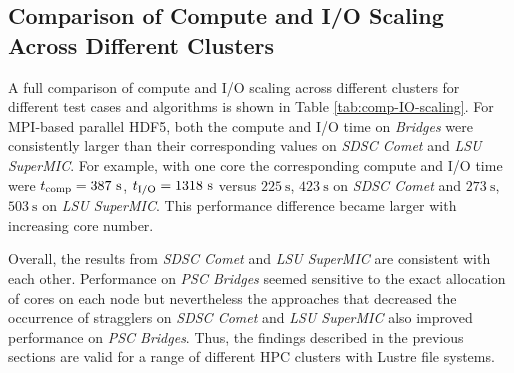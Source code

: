 \subsection{Comparison of Compute and I/O Scaling Across Different Clusters}
A full comparison of compute and I/O scaling across different clusters for different test cases and algorithms is shown in Table \ref{tab:comp-IO-scaling}. 
For MPI-based parallel HDF5, both the compute and I/O time on \emph{Bridges} were consistently larger than their corresponding values on \emph{SDSC Comet} and \emph{LSU SuperMIC}.
For example, with one core the corresponding compute and I/O time were ${t}_{\text{comp}} = 387~\text{s}$, ${t}_{\text{I/O}} = 1318~\text{s}$ versus $225~\text{s}$, $423~\text{s}$ on \emph{SDSC Comet} and $273~\text{s}$, $503~\text{s}$ on \emph{LSU SuperMIC}.
This performance difference became larger with increasing core number.

Overall, the results from \emph{SDSC Comet} and \emph{LSU SuperMIC} are consistent with each other.
Performance on \emph{PSC Bridges} seemed sensitive to the exact allocation of cores on each node but nevertheless the approaches that decreased the occurrence of stragglers on \emph{SDSC Comet} and \emph{LSU SuperMIC} also improved performance on \emph{PSC Bridges}.
Thus, the findings described in the previous sections are valid for a range of different HPC clusters with Lustre file systems.

